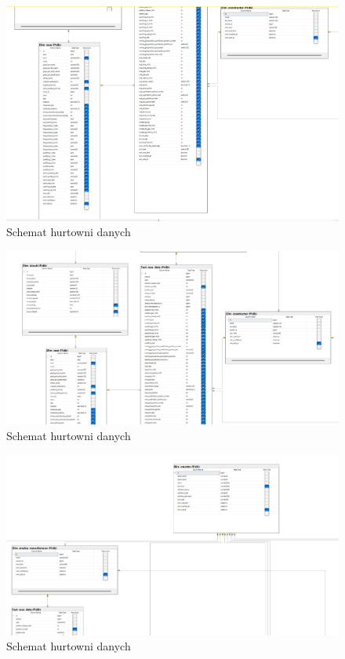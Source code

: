 \documentclass[12pt]{article}
\begin{document}
\begin{figure}[H]
    \centering
    \includegraphics[width=\textwidth]{diagram2.png}
    \caption{Schemat hurtowni danych}
\end{figure}

\begin{figure}[H]
    \centering
    \includegraphics[width=\textwidth]{diagram3.png}
    \caption{Schemat hurtowni danych}
\end{figure}

\begin{figure}[H]
    \centering
    \includegraphics[width=\textwidth]{diagram4.png}
    \caption{Schemat hurtowni danych}
\end{figure}
\end{document}
